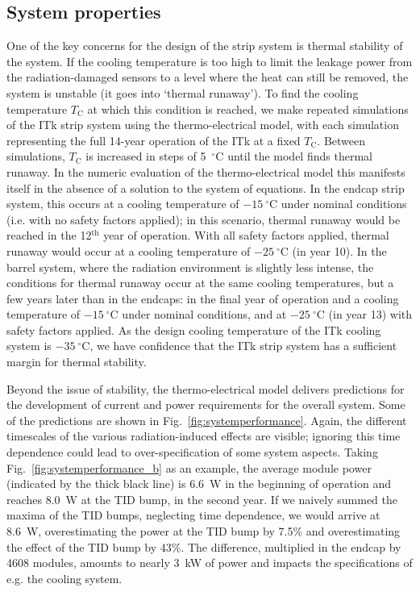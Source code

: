 \subsection{System properties}\label{sec:systemprop}
One of the key concerns for the design of the strip system is thermal stability of the system. If the cooling temperature is too high to limit the leakage power from the radiation-damaged sensors to a level where the heat can still be removed, the system is unstable (it goes into `thermal runaway').
To find the cooling temperature $T_\text{C}$ at which this condition is reached, we make repeated simulations of the ITk strip system using the thermo-electrical model, with each simulation representing the full 14-year operation of the ITk at a fixed $T_\text{C}$. Between simulations, $T_\text{C}$ is increased in steps of 5~$^\circ$C until the model finds thermal runaway. In the numeric evaluation of the thermo-electrical model this manifests itself in the absence of a solution to the system of equations. In the endcap strip system, this occurs at a cooling temperature of $-15~^\circ$C under nominal conditions (i.e. with no safety factors applied); in this scenario, thermal runaway would be reached in the 12$^\text{th}$ year of operation. With all safety factors applied, thermal runaway would occur at a cooling temperature of $-25~^\circ$C (in year 10).
In the barrel system, where the radiation environment is slightly less intense, the conditions for thermal runaway occur at the same cooling temperatures, but a few years later than in the endcaps: in the final year of operation and a cooling temperature of $-15~^\circ$C under nominal conditions, and at $-25~^\circ$C (in year 13) with safety factors applied.
As the design cooling temperature of the ITk cooling system is $-35~^\circ$C, we have confidence that the ITk strip system has a sufficient margin for thermal stability.

Beyond the issue of stability, the thermo-electrical model delivers predictions for the development of current and power requirements for the overall system. Some of the predictions are shown in Fig.~\ref{fig:systemperformance}. Again, the different timescales of the various radiation-induced effects are visible; ignoring this time dependence could lead to over-specification of some system aspects.
Taking Fig.~\ref{fig:systemperformance_b} as an example, the average module power (indicated by the thick black line) is 6.6~W in the beginning of operation and reaches 8.0~W at the TID bump, in the second year. If we naively summed the maxima of the TID bumps, neglecting time dependence, we would arrive at 8.6~W, overestimating the power at the TID bump by 7.5\% and overestimating the effect of the TID bump by 43\%.
The difference, multiplied in the endcap by 4608 modules, amounts to nearly 3~kW of power and impacts the specifications of e.g. the cooling system.

